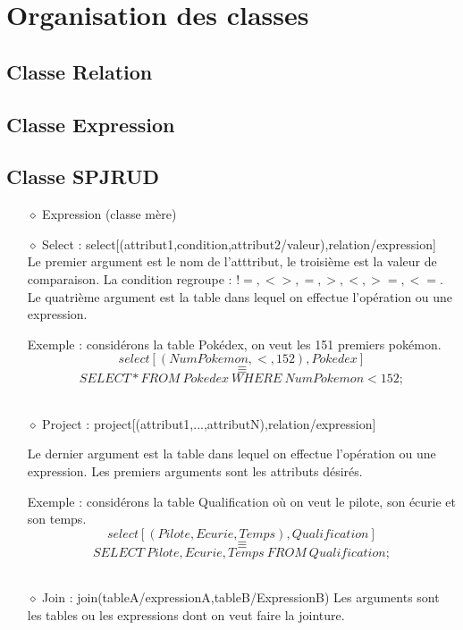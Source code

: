 \documentclass[10pt,a4paper]{article}
\begin{document}
\section{Organisation des classes}
\subsection{Classe Relation}
\newpage
\subsection{Classe Expression}

\subsection{Classe SPJRUD}
\begin{itemize}
\item[$\diamond$] Expression (classe mère)

\item[$\diamond$] Select : select[(attribut1,condition,attribut2/valeur),relation/expression]
\\[1mm]
Le premier argument est le nom de l'atttribut, le troisième est la valeur de comparaison. La condition regroupe : $!=,<>,=,>,<,>=,<=.$ Le quatrième argument est la table dans lequel on effectue l'opération ou une expression.

Exemple : considérons la table Pokédex, on veut les 151 premiers \newline pokémon.
\[
select[(NumPokemon,<,152),Pokedex]
\]
\[
\equiv
\]
\[
SELECT * FROM\ Pokedex\ WHERE\ NumPokemon < 152;
\]
\\

\item[$\diamond$] Project : project[(attribut1,...,attributN),relation/expression]

Le dernier argument est la table dans lequel on effectue l'opération ou une expression. Les premiers arguments sont les attributs désirés.

Exemple : considérons la table Qualification où on veut le pilote, son écurie et son temps.
\[
select[(Pilote,Ecurie,Temps),Qualification]
\]
\[
\equiv
\]
\[
SELECT\ Pilote,Ecurie,Temps\ FROM\ Qualification;
\]
\\

\item[$\diamond$] Join : join(tableA/expressionA,tableB/ExpressionB)
Les arguments sont les tables ou les expressions dont on veut faire la jointure.


\end{itemize}
\end{document}

